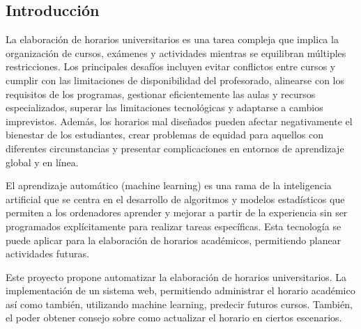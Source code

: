 \subsection{Introducción}

La elaboración de horarios universitarios es una tarea compleja que implica la organización de cursos, exámenes y actividades mientras se equilibran múltiples restricciones. Los principales desafíos incluyen evitar conflictos entre cursos y cumplir con las limitaciones de disponibilidad del profesorado, alinearse con los requisitos de los programas, gestionar eficientemente las aulas y recursos especializados, superar las limitaciones tecnológicas y adaptarse a cambios imprevistos.
Además, los horarios mal diseñados pueden afectar negativamente el bienestar de los estudiantes, crear problemas de equidad para aquellos con diferentes circunstancias y presentar complicaciones en entornos de aprendizaje global y en línea.

El aprendizaje automático (machine learning) es una rama de la inteligencia artificial que se centra en el desarrollo de algoritmos y modelos estadísticos que permiten a los ordenadores aprender y mejorar a partir de la experiencia sin ser programados explícitamente para realizar tareas específicas.
Esta tecnología se puede aplicar para la elaboración de horarios académicos, permitiendo planear actividades futuras.

Este proyecto propone automatizar la elaboración de horarios universitarios. 
La implementación de un sistema web, permitiendo administrar el horario académico así como también, utilizando machine learning, predecir futuros cursos.
También, el poder obtener consejo sobre como actualizar el horario en ciertos escenarios.
